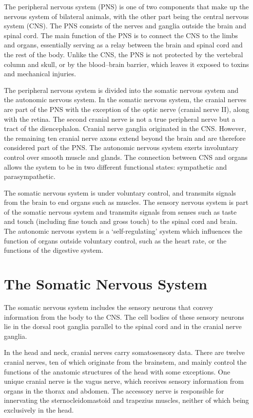 The peripheral nervous system (PNS) is one of two components that make up the nervous system of bilateral animals, with the other part being the central nervous system (CNS). The PNS consists of the nerves and ganglia outside the brain and spinal cord. The main function of the PNS is to connect the CNS to the limbs and organs, essentially serving as a relay between the brain and spinal cord and the rest of the body. Unlike the CNS, the PNS is not protected by the vertebral column and skull, or by the blood--brain barrier, which leaves it exposed to toxins and mechanical injuries.

The peripheral nervous system is divided into the somatic nervous system and the autonomic nervous system. In the somatic nervous system, the cranial nerves are part of the PNS with the exception of the optic nerve (cranial nerve II), along with the retina. The second cranial nerve is not a true peripheral nerve but a tract of the diencephalon. Cranial nerve ganglia originated in the CNS. However, the remaining ten cranial nerve axons extend beyond the brain and are therefore considered part of the PNS. The autonomic nervous system exerts involuntary control over smooth muscle and glands. The connection between CNS and organs allows the system to be in two different functional states: sympathetic and parasympathetic.

The somatic nervous system is under voluntary control, and transmits signals from the brain to end organs such as muscles. The sensory nervous system is part of the somatic nervous system and transmits signals from senses such as taste and touch (including fine touch and gross touch) to the spinal cord and brain. The autonomic nervous system is a `self-regulating' system which influences the function of organs outside voluntary control, such as the heart rate, or the functions of the digestive system.

\hypertarget{the-somatic-nervous-system}{%
\section{The Somatic Nervous System}\label{the-somatic-nervous-system}}

The somatic nervous system includes the sensory neurons that convey information from the body to the CNS. The cell bodies of these sensory neurons lie in the dorsal root ganglia parallel to the spinal cord and in the cranial nerve ganglia.

In the head and neck, cranial nerves carry somatosensory data. There are twelve cranial nerves, ten of which originate from the brainstem, and mainly control the functions of the anatomic structures of the head with some exceptions. One unique cranial nerve is the vagus nerve, which receives sensory information from organs in the thorax and abdomen. The accessory nerve is responsible for innervating the sternocleidomastoid and trapezius muscles, neither of which being exclusively in the head.

